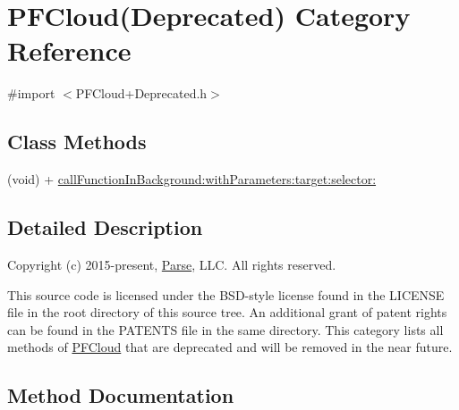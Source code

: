 \hypertarget{category_p_f_cloud_07_deprecated_08}{}\section{P\+F\+Cloud(Deprecated) Category Reference}
\label{category_p_f_cloud_07_deprecated_08}


{\ttfamily \#import $<$P\+F\+Cloud+\+Deprecated.\+h$>$}

\subsection*{Class Methods}
\begin{DoxyCompactItemize}
\item 
(void) + \hyperlink{category_p_f_cloud_07_deprecated_08_ac66d0c219ea8bf3374a50a65f56b2040}{call\+Function\+In\+Background\+:with\+Parameters\+:target\+:selector\+:}
\end{DoxyCompactItemize}


\subsection{Detailed Description}
Copyright (c) 2015-\/present, \hyperlink{interface_parse}{Parse}, L\+L\+C. All rights reserved.

This source code is licensed under the B\+S\+D-\/style license found in the L\+I\+C\+E\+N\+S\+E file in the root directory of this source tree. An additional grant of patent rights can be found in the P\+A\+T\+E\+N\+T\+S file in the same directory. This category lists all methods of {\ttfamily \hyperlink{interface_p_f_cloud}{P\+F\+Cloud}} that are deprecated and will be removed in the near future. 

\subsection{Method Documentation}
\hypertarget{category_p_f_cloud_07_deprecated_08_ac66d0c219ea8bf3374a50a65f56b2040}{}
